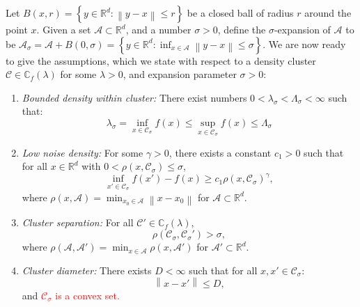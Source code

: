 \documentclass{article}
\newcommand{\diam}{\mathrm{diam}}
\newcommand{\set}[1]{\left\{#1\right\}}
\newcommand{\Reals}{\mathbb{R}}
\newcommand{\Rd}{\Reals^d}
\newcommand{\norm}[1]{\left\lVert#1\right\rVert}
\newcommand{\1}{\mathbf{1}}
\newcommand{\Cbb}{\mathbb{C}}
\newcommand{\Cset}{\mathcal{C}}
\newcommand{\Aset}{\mathcal{A}}
\newcommand{\Asig}{\Aset_{\sigma}}
\newcommand{\Csig}{\Cset_{\sigma}}
\theoremstyle{aldenthm}
\theoremstyle{remark}
\begin{document}
Let $B(x,r) = \set{y \in \Rd: \norm{y - x} \leq r}$ be a closed ball of radius $r$ around the point $x$.  Given a set $\Aset \subset \Rd$, and a number $\sigma > 0$, define the $\sigma$-expansion of $\Aset$ to be $\Asig = \Aset + B(0,\sigma) = \set{y \in \Rd: \inf_{x \in \Aset} \norm{y - x} \leq \sigma}$. We are now ready to give the assumptions, which we state with respect to a density cluster $\Cset \in \Cbb_f(\lambda)$ for some $\lambda > 0$, and expansion parameter $\sigma > 0$:
\begin{enumerate}[label=(A\arabic*)]
	\item
	\label{asmp: bounded_density}
	\textit{Bounded density within cluster:} There exist numbers $0 < \lambda_{\sigma} <  \Lambda_{\sigma} < \infty$ such that:
	\begin{equation}
	\label{eqn: bounded_density}
	\lambda_{\sigma} = \inf_{x \in \Csig} f(x) \leq \sup_{x \in \Csig} f(x) \leq \Lambda_{\sigma} 
	\end{equation} 
	
	\item 
	\label{asmp: low_noise_density}
	\textit{Low noise density:} For some $\gamma > 0 $, there exists a constant $c_1 > 0$ such that for all $x \in \Rd$ with $0 < \rho(x, \Csig) \leq \sigma$,
	\begin{equation*}
	\inf_{x' \in \Csig} f(x') - f(x) \geq c_1 \rho(x, \Csig)^{\gamma},
	\end{equation*}
	where $\rho(x,\Aset) = \min_{x_0 \in \Aset} \norm{x - x_0}$ for $\Aset \subset \Rd$.
	
	\item
	\label{asmp: cluster_separation}
	\textit{Cluster separation:}
	For all $\Cset' \in \Cbb_f(\lambda)$,
	\begin{equation*}
	\rho(\Csig,\Csig') > \sigma,
	\end{equation*}
	where $\rho(\Aset,\Aset') = \min_{x \in \Aset} \rho(x,\Aset')$ for $\Aset' \subset \Rd$. 
	
	\item
	\label{asmp: cluster_diameter}
	\textit{Cluster diameter:}
	There exists $D < \infty$ such that for all $x, x' \in \Csig$:
	\begin{equation*}
	\norm{x - x'} \leq D,
	\end{equation*}
	and \textcolor{red}{$\Csig$ is a convex set.}
\end{enumerate}
\end{document}

